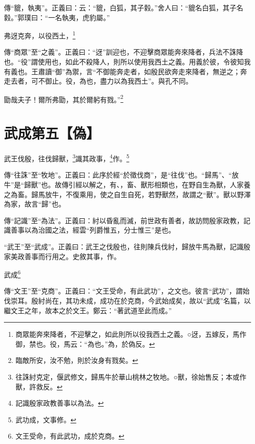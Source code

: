 {\noindent\zhuan{}\fzbyks 傳“貔，執夷”。正義曰：云：“貔，白狐，其子豰。”舍人曰：“貔名白狐，其子名豰。”郭璞曰：“一名執夷，虎豹屬。” \par}

弗迓克奔，以役西土，\footnote{商眾能奔來降者，不迎擊之，如此則所以役我西土之義。○迓，五嫁反，馬作御，禁也。役，馬云：“為也。”為，於偽反。}

{\noindent\zhuan{}\fzbyks 傳“商眾”至“之義”。正義曰：“迓”訓迎也，不迎擊商眾能奔來降者，兵法不誅降也。“役”謂使用也，如此不殺降人，則所以使用我西土之義。用義於彼，令彼知我有義也。王肅讀“御”為禦，言“不御能奔走者，如殷民欲奔走來降者，無逆之；奔走去者，可不御止。役，為也，盡力以為我西土”。與孔不同。 \par}

勖哉夫子！爾所弗勖，其於爾躬有戮。”\footnote{臨敵所安，汝不勉，則於汝身有戮矣。}

\section{武成第五【偽】}


武王伐殷，往伐歸獸，\footnote{往誅紂克定，偃武修文，歸馬牛於華山桃林之牧地。○獸，徐始售反；本或作獸，許救反。}識其政事，\footnote{記識殷家政教善事以為法。}作。\footnote{武功成，文事修。}


{\noindent\zhuan{}\fzbyks 傳“往誅”至“牧地”。正義曰：此序於經“於徵伐商”，是“往伐”也。“歸馬”、“放牛”是“歸獸”也。故傳引經以解之，有、，畜、獸形相類也，在野自生為獸，人家養之為畜。歸馬放牛，不復乘用，使之自生自死，若野獸然，故謂之“獸”。獸以野澤為家，故言“歸”也。 \par}

{\noindent\zhuan{}\fzbyks 傳“記識”至“為法”。正義曰：紂以昏亂而滅，前世政有善者，故訪問殷家政教，記識善事以為治國之法，經雲“列爵惟五，分士惟三”是也。 \par}

{\noindent\shu{}\fzkt “武王”至“武成”。正義曰：武王之伐殷也，往則陳兵伐紂，歸放牛馬為獸，記識殷家美政善事而行用之。史敘其事，作。 \par}

武成\footnote{文王受命，有此武功，成於克商。}

{\noindent\zhuan{}\fzbyks 傳“文王”至“克商”。正義曰：“文王受命，有此武功”，之文也。彼言“武功”，謂始伐崇耳。殷紂尚在，其功未成，成功在於克商，今武始成矣，故以“武成”名篇，以繼文王之年，故本之於文王。鄭云：“著武道至此而成。” \par}

